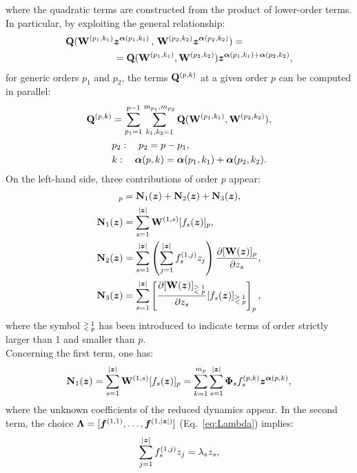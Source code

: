\documentclass[%
reprint,
superscriptaddress,
 amsmath,amssymb,
 aps,
 pre
]{revtex4-2}
\begin{document}
%
where the quadratic terms are constructed from the product of lower-order terms. In particular, 
by exploiting the general relationship:
%
\begin{align*}
    \mathbf{Q}(\mathbf{W}^{(p_1,k_1)} &{\boldsymbol{z}}^{\boldsymbol{\alpha} (p_1,k_1)} \, , \,   \mathbf{W}^{(p_2,k_2)} {\boldsymbol{z}}^{\boldsymbol{\alpha} (p_2,k_2)}) =\\ 
 &= \mathbf{Q}(\mathbf{W}^{(p_1,k_1)} ,\mathbf{W}^{(p_2,k_2)})  {\boldsymbol{z}}^{\boldsymbol{\alpha} (p_1,k_1) + \boldsymbol{\alpha} (p_2,k_2)},
\end{align*}
%
for generic orders $p_1$ and $p_2$, the terms $\mathbf{Q}^{(p,k)}$ at a given order $p$ can be computed in parallel:
\begin{align}
    \mathbf{Q}^{(p,k)} & = 
    \sum_{p_1=1}^{p-1} 
    \sum_{k_1,k_2=1}^{m_{p_1},m_{p_2}} 
    \mathbf{Q} (\mathbf{W}^{(p_1,k_1)} ,\mathbf{W}^{(p_2,k_2)}),  
    \\     
    & p_2: \quad p_2=p-p_1,
    \nonumber 
    \\
    & k : \quad \boldsymbol{\alpha}(p,k)=\boldsymbol{\alpha} (p_1,k_1) + \boldsymbol{\alpha} (p_2,k_2).
    \nonumber
\end{align}
On the left-hand side, three contributions of order $p$ appear:
\begin{align}
    [\nabla_{\bfz} \bfm{W} (\bfz) \bff (\bfz)]_p &= \bfm{N}_1(\bfz) + \bfm{N}_2(\bfz) + \bfm{N}_3(\bfz),\\
    \bfm{N}_1(\bfz) &= \sum_{s=1}^{|\bfz|}  \bfm{W}^{(1,s)} [f_s(\bfz)]_p, \nonumber \\
    \bfm{N}_2(\bfz) &= \sum_{s=1}^{|\bfz|} \left( \sum_{j=1}^{|\bfz|} f_s^{(1,j)} z_j  \right) \frac{\partial [\bfm{W}(\bfz)]_p}{\partial z_s}, \nonumber \\
    \bfm{N}_3(\bfz) &= \sum_{s=1}^{|\bfz|} \left[ \frac{\partial [\bfm{W}(\bfz)]_{\dblnk} } {\partial z_s} [f_s(\bfz)]_{\dblnk} \right]_p, \nonumber
\end{align}
where the symbol $\dblnk$ has been introduced to indicate terms of order strictly larger than 1 and smaller than $p$.\\
Concerning the first term, one has:
\begin{equation}
    \mathbf{N}_1({\boldsymbol{z}}) = \sum_{s=1}^{|{\boldsymbol{z}}|}  \mathbf{W}^{(1,s)} [f_s({\boldsymbol{z}})]_p = \sum_{k=1}^{m_p} \sum_{s=1}^{|{\boldsymbol{z}}|}  \boldsymbol{\Phi}_s f_s^{(p,k)}{\boldsymbol{z}}^{\boldsymbol{\alpha}(p,k)},
\end{equation}
where the unknown coefficients of the reduced dynamics appear.
In the second term, the choice $\boldsymbol{\Lambda} = [\boldsymbol{f}^{(1,1)},\ldots,\boldsymbol{f}^{(1,|{\boldsymbol{z}}|)}]$ (Eq.~\eqref{eq:Lambda}) implies:
\begin{equation}
     \sum_{j=1}^{|{\boldsymbol{z}}|} f_s^{(1,j)} z_j = \lambda_s z_s,
\end{equation}
\end{document}
